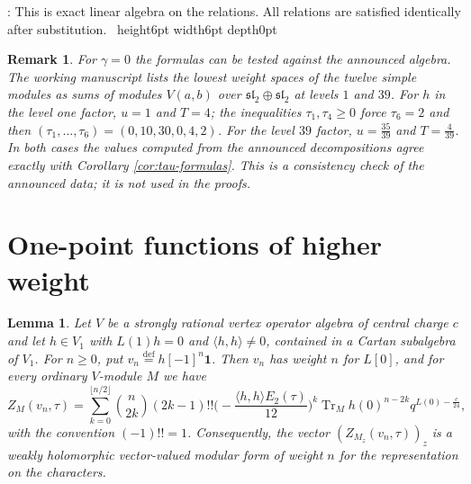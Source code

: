 \documentclass[leqno]{article}
\renewcommand{\geq}{\ensuremath{\geqslant}}
\newcommand{\qed}{\hfill \vrule height6pt  width6pt depth0pt}
\newcommand{\ov}{\overset}
\newtheorem{lemma}[thm]{Lemma}
\newtheorem{remark}[thm]{Remark}
\newenvironment{proof}[1][]{\noindent {\it Proof #1} : }{\hbox{~}\qed
\smallskip
}
\numberwithin{equation}{section}
\begin{document}
\begin{proof}
This is exact linear algebra on the relations. All relations are satisfied identically after substitution.
\end{proof}

\begin{remark}\normalfont
\label{rem:gamma0-check}
For $\gamma = 0$ the formulas can be tested against the announced algebra. The working manuscript \cite{Rie26b} lists the lowest weight spaces of the twelve simple modules as sums of modules $V(a,b)$ over $\mathfrak{sl}_2 \oplus \mathfrak{sl}_2$ at levels $1$ and $39$. For $h$ in the level one factor, $u = 1$ and $T = 4$; the inequalities $\tau_1,\tau_4 \geq 0$ force $\tau_6 = 2$ and then $(\tau_1,\ldots,\tau_6) = (0,10,30,0,4,2)$. For the level $39$ factor, $u = \frac{35}{39}$ and $T = \frac{4}{39}$. In both cases the values computed from the announced decompositions agree exactly with Corollary \ref{cor:tau-formulas}. This is a consistency check of the announced data; it is not used in the proofs.
\end{remark}

\section{One-point functions of higher weight}
\label{sec:higher-weight}

\begin{lemma}
\label{lem:hermite}
Let $V$ be a strongly rational vertex operator algebra of central charge $c$ and let $h \in V_1$ with $L(1)h = 0$ and $\langle h,h\rangle \neq 0$, contained in a Cartan subalgebra of $V_1$. For $n \geq 0$, put $v_n \ov{\mathrm{def}}{=} h[-1]^n\mathbf 1$. Then $v_n$ has weight $n$ for $L[0]$, and for every ordinary $V$-module $M$ we have
\begin{equation}
\label{eq:hermite}
Z_M(v_n,\tau) = \sum_{k = 0}^{\lfloor n/2\rfloor}\binom{n}{2k}(2k-1)!!\Big(-\frac{\langle h,h\rangle E_2(\tau)}{12}\Big)^k\operatorname{Tr}_M h(0)^{n-2k}q^{L(0)-\frac{c}{24}},
\end{equation}
with the convention $(-1)!! = 1$. Consequently, the vector $(Z_{M_z}(v_n,\tau))_z$ is a weakly holomorphic vector-valued modular form of weight $n$ for the representation on the characters.
\end{lemma}
\end{document}
